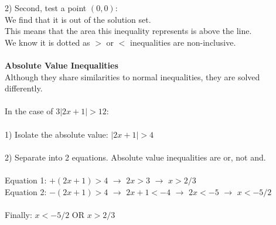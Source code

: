 \documentclass{article}
\begin{document}
	2) Second, test a point $(0, 0)$: \\
	We find that it is out of the solution set. \\
	This means that the area this inequality represents is above the line. \\
	We know it is dotted as $>$ or $<$ inequalities are non-inclusive. \\\\
	\textbf{Absolute Value Inequalities} \\
	Although they share similarities to normal inequalities, they are solved differently. 
	\\\\ In the case of $3|2x+1|>12$:\\ \\
	1) Isolate the absolute value: 
	$|2x+1|>4$  \\ \\
	2) Separate into 2 equations. Absolute value inequalities are or, not and. \\
	\\Equation 1: $+(2x+1) > 4$ $\rightarrow$ $2x > 3$ $\rightarrow$ $x>2/3$
	\\Equation 2: $-(2x+1) > 4$ $\rightarrow$ $2x+1< -4$ $\rightarrow$ $2x < -5$ $\rightarrow$ $x < -5/2$ \\ \\
	Finally: $x < -5/2$ OR $x>2/3$ \\
\end{document}
